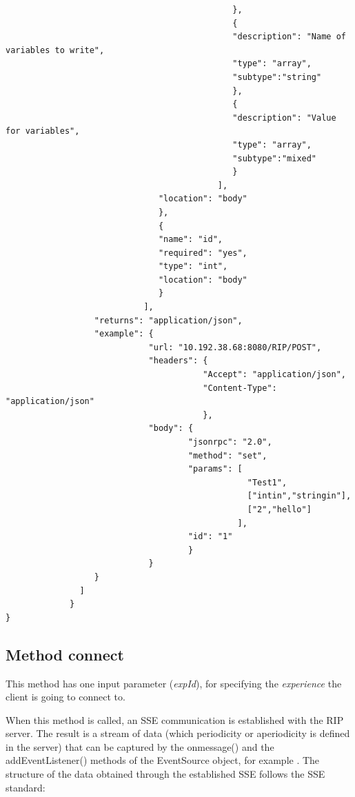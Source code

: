 \begin{lstlisting}
                                              },
                                              {
                                              "description": "Name of variables to write",
                                              "type": "array",
                                              "subtype":"string"
                                              },
                                              {
                                              "description": "Value for variables",
                                              "type": "array",
                                              "subtype":"mixed"
                                              }
                                           ],
                               "location": "body"
                               },
                               {
                               "name": "id",
                               "required": "yes",
                               "type": "int",
                               "location": "body"
                               }
                            ],
                  "returns": "application/json",
                  "example": {
                             "url: "10.192.38.68:8080/RIP/POST",
                             "headers": {
                                        "Accept": "application/json",
                                        "Content-Type": "application/json"
                                        },
                             "body": {
                                     "jsonrpc": "2.0",
                                     "method": "set",
                                     "params": [
                                                 "Test1",
                                                 ["intin","stringin"],
                                                 ["2","hello"]
                                               ],
                                     "id": "1"
                                     }
                             }
                  }
               ]
             }
}
\end{lstlisting}

\subsection{Method connect}
This method has one input parameter (\textit{expId}), for specifying the \textit{experience} the client is going to connect to. 

When this method is called, an SSE communication is established with the RIP server. The result is a stream of data (which periodicity or aperiodicity is defined in the server) that can be captured by the onmessage() and the addEventListener() methods of the EventSource object, for example \cite{eventsource}. The structure of the data obtained through the established SSE follows the SSE standard:

